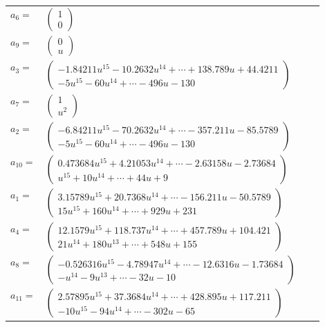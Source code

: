 \documentclass[1p]{elsarticle_modified}
\theoremstyle{definition}
\begin{document}
\begin{tabular}{m{7pt} m{180pt} m{7pt} m{180pt} }
\flushright $a_{6}=$&$\begin{pmatrix}1\\0\end{pmatrix}$ \\
\flushright $a_{9}=$&$\begin{pmatrix}0\\u\end{pmatrix}$ \\
\flushright $a_{3}=$&$\begin{pmatrix}-1.84211 u^{15}-10.2632 u^{14}+\cdots+138.789 u+44.4211\\-5 u^{15}-60 u^{14}+\cdots-496 u-130\end{pmatrix}$ \\
\flushright $a_{7}=$&$\begin{pmatrix}1\\u^2\end{pmatrix}$ \\
\flushright $a_{2}=$&$\begin{pmatrix}-6.84211 u^{15}-70.2632 u^{14}+\cdots-357.211 u-85.5789\\-5 u^{15}-60 u^{14}+\cdots-496 u-130\end{pmatrix}$ \\
\flushright $a_{10}=$&$\begin{pmatrix}0.473684 u^{15}+4.21053 u^{14}+\cdots-2.63158 u-2.73684\\u^{15}+10 u^{14}+\cdots+44 u+9\end{pmatrix}$ \\
\flushright $a_{1}=$&$\begin{pmatrix}3.15789 u^{15}+20.7368 u^{14}+\cdots-156.211 u-50.5789\\15 u^{15}+160 u^{14}+\cdots+929 u+231\end{pmatrix}$ \\
\flushright $a_{4}=$&$\begin{pmatrix}12.1579 u^{15}+118.737 u^{14}+\cdots+457.789 u+104.421\\21 u^{14}+180 u^{13}+\cdots+548 u+155\end{pmatrix}$ \\
\flushright $a_{8}=$&$\begin{pmatrix}-0.526316 u^{15}-4.78947 u^{14}+\cdots-12.6316 u-1.73684\\- u^{14}-9 u^{13}+\cdots-32 u-10\end{pmatrix}$ \\
\flushright $a_{11}=$&$\begin{pmatrix}2.57895 u^{15}+37.3684 u^{14}+\cdots+428.895 u+117.211\\-10 u^{15}-94 u^{14}+\cdots-302 u-65\end{pmatrix}$ \\

\end{tabular}
\end{document}
